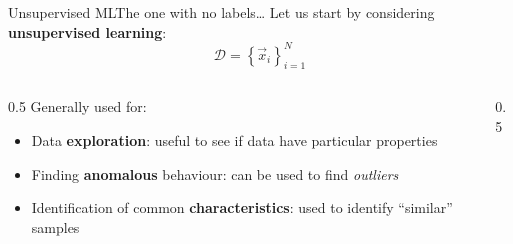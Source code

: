\begin{frame}{Unsupervised ML}{The one with no labels\dots}
    Let us start by considering \textbf{unsupervised learning}:
    \begin{equation*}
        \mathcal{D} = \left\{ \vec{x}_i \right\}_{i = 1}^N
    \end{equation*}

    \vfill

    \begin{columns}[c]
        \begin{column}{0.5\textwidth}
            Generally used for:
            \begin{itemize}
                \item \alert<2>{Data \textbf{exploration}: useful to see if data have particular properties}
                \item \alert<3>{Finding \textbf{anomalous} behaviour: can be used to find \emph{outliers}}
                \item \alert<4>{Identification of common \textbf{characteristics}: used to identify \enquote{similar} samples}
            \end{itemize}
        \end{column}
        \hfil
        \begin{column}{0.5\textwidth}
            \centering
            
        \end{column}
    \end{columns}
\end{frame}

